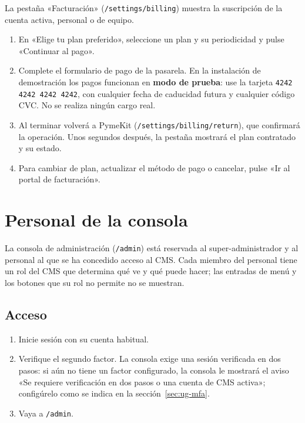 La pestaña «Facturación» (\texttt{/settings/billing}) muestra la suscripción
de la cuenta activa, personal o de equipo.

\begin{enumerate}
  \item En «Elige tu plan preferido», seleccione un plan y su periodicidad y
        pulse «Continuar al pago».
  \item Complete el formulario de pago de la pasarela. En la instalación de
        demostración los pagos funcionan en \textbf{modo de prueba}: use la
        tarjeta \texttt{4242 4242 4242 4242}, con cualquier fecha de caducidad
        futura y cualquier código CVC. No se realiza ningún cargo real.
  \item Al terminar volverá a PymeKit (\texttt{/settings/billing/return}),
        que confirmará la operación. Unos segundos después, la pestaña
        mostrará el plan contratado y su estado.
  \item Para cambiar de plan, actualizar el método de pago o cancelar,
        pulse «Ir al portal de facturación».
\end{enumerate}

\section{Personal de la consola}
\label{sec:ug-personal}

La consola de administración (\texttt{/admin}) está reservada al
super-administrador y al personal al que se ha concedido acceso al CMS. Cada
miembro del personal tiene un rol del CMS que determina qué ve y qué puede
hacer; las entradas de menú y los botones que su rol no permite no se
muestran.

\subsection{Acceso}

\begin{enumerate}
  \item Inicie sesión con su cuenta habitual.
  \item Verifique el segundo factor. La consola exige una sesión verificada
        en dos pasos: si aún no tiene un factor configurado, la consola le
        mostrará el aviso «Se requiere verificación en dos pasos o una cuenta
        de CMS activa»; configúrelo como se indica en la
        sección~\ref{sec:ug-mfa}.
  \item Vaya a \texttt{/admin}.
\end{enumerate}

